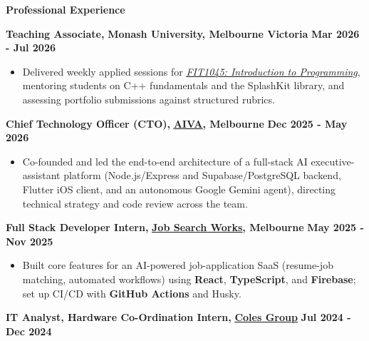 \documentclass[11pt, a4paper]{article}
\let\hrefnoul\href
\renewcommand{\href}[2]{\hrefnoul{#1}{\ul{#2}}}
\newcommand{\resumesection}[1]{%
  \vspace{6pt}\par
  {\setlength{\fboxsep}{5pt}%
   \noindent\colorbox{sectionbg}{%
     \parbox{\dimexpr\linewidth-10pt\relax}{\strut\textbf{\large #1}\strut}%
   }}%
  \vspace{2pt}\par
}
\begin{document}
\resumesection{Professional Experience}

\noindent\textbf{Teaching Associate,} \textbf{Monash University, Melbourne Victoria}%
\hfill\textbf{Mar 2026 - Jul 2026}

\begin{itemize}[leftmargin=1.5em, itemsep=2pt, topsep=1pt, parsep=0pt]
  \item Delivered weekly applied sessions for
        \href{https://handbook.monash.edu/2025/units/fit1045}{\textit{FIT1045: Introduction to Programming}},
        mentoring students on C++ fundamentals and the SplashKit library, and assessing portfolio
        submissions against structured rubrics.
\end{itemize}

\vspace{3pt}
\noindent\textbf{Chief Technology Officer (CTO),}
\href{https://github.com/AIVA-MVP}{\textbf{AIVA}}\textbf{, Melbourne}%
\hfill\textbf{Dec 2025 - May 2026}

\begin{itemize}[leftmargin=1.5em, itemsep=2pt, topsep=1pt, parsep=0pt]
  \item Co-founded and led the end-to-end architecture of a full-stack AI executive-assistant
        platform (Node.js/Express and Supabase/PostgreSQL backend, Flutter iOS client, and an
        autonomous Google Gemini agent), directing technical strategy and code review across the team.
\end{itemize}

\newpage
\vspace{3pt}
\noindent\textbf{Full Stack Developer Intern,}
\href{https://app.jobsearch.works/}{\textbf{Job Search Works}}\textbf{, Melbourne}%
\hfill\textbf{May 2025 - Nov 2025}

\begin{itemize}[leftmargin=1.5em, itemsep=2pt, topsep=1pt, parsep=0pt]
  \item Built core features for an AI-powered job-application SaaS (resume-job matching, automated
        workflows) using \textbf{React}, \textbf{TypeScript}, and \textbf{Firebase}; set up CI/CD
        with \textbf{GitHub Actions} and Husky.
\end{itemize}

\vspace{3pt}
\noindent\textbf{IT Analyst, Hardware Co-Ordination Intern,}
\href{https://www.linkedin.com/company/colesgroup/posts/?feedView=all}{\textbf{Coles Group}}%
\hfill\textbf{Jul 2024 - Dec 2024}
\end{document}
